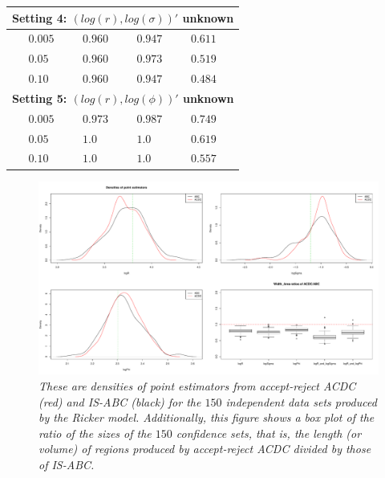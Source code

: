 \begin{table}
{\begin{tabular}{lllll}
\multicolumn{5}{l}{\textbf{Setting 4: $(log(r), log(\sigma))'$} unknown}               \\ \hline
          & $0.005$             & $0.960$             & $0.947$         & $0.611$               \\
          & $0.05$              & $0.960$             & $0.973$        & $0.519$                \\
          & $0.10$              & $0.960$             & $0.947$        & $0.484$                \\ \hline
\multicolumn{5}{l}{\textbf{Setting 5: $(log(r), log(\phi))'$ unknown}}          \\ \hline
          & $0.005$             & $0.973$             & $0.987$         & $0.749$               \\
          & $0.05$              & $1.0$             & $1.0$        & $0.619$                \\
          & $0.10$              & $1.0$             & $1.0$        & $0.557$                %
\end{tabular}\label{EX2_results}}
\end{table}


\begin{figure}
\centering
\caption{{\it These are densities of point estimators from accept-reject ACDC (red) and IS-ABC (black) for the $150$ independent data sets produced by the Ricker model. Additionally, this figure shows a box plot of the ratio of the sizes of the $150$ confidence sets, that is, the length (or volume) of regions produced by accept-reject ACDC divided by those of IS-ABC.
}}\label{fig:EX2_results}
\includegraphics[width=0.9\linewidth]{Images/Ricker_one_run.pdf}
\end{figure}


